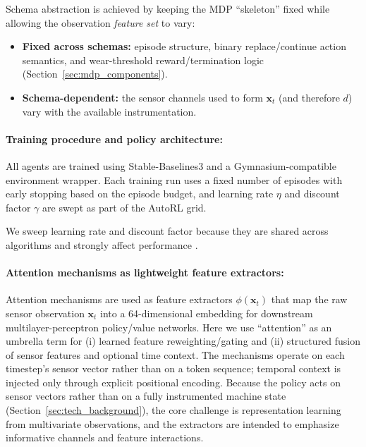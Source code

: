 \documentclass[sn-basic]{sn-jnl} %
\begin{document}
Schema abstraction is achieved by keeping the MDP ``skeleton'' fixed while allowing the observation \emph{feature set} to vary:
\begin{itemize}
	\item \textbf{Fixed across schemas:} episode structure, binary replace/continue action semantics, and wear-threshold reward/termination logic (Section~\ref{sec:mdp_components}).
	\item \textbf{Schema-dependent:} the sensor channels used to form $\mathbf{x}_t$ (and therefore $d$) vary with the available instrumentation.
\end{itemize}

\paragraph{Training procedure and policy architecture:}
All agents are trained using Stable-Baselines3 and a Gymnasium-compatible environment wrapper. Each training run uses a fixed number of episodes with early stopping based on the episode budget, and learning rate $\eta$ and discount factor $\gamma$ are swept as part of the AutoRL grid.

We sweep learning rate and discount factor because they are shared across algorithms and strongly affect performance \cite{Henderson2019, Shala2022AutoRL, Eimer2023}.
  
\paragraph{Attention mechanisms as lightweight feature extractors:}
\label{sec:attention}

Attention mechanisms are used as feature extractors $\phi(\mathbf{x}_t)$ that map the raw sensor observation $\mathbf{x}_t$ into a 64-dimensional embedding for downstream multilayer-perceptron policy/value networks. Here we use ``attention'' as an umbrella term for (i) learned feature reweighting/gating and (ii) structured fusion of sensor features and optional time context. The mechanisms operate on each timestep's sensor vector rather than on a token sequence; temporal context is injected only through explicit positional encoding. Because the policy acts on sensor vectors rather than on a fully instrumented machine state (Section~\ref{sec:tech_background}), the core challenge is representation learning from multivariate observations, and the extractors are intended to emphasize informative channels and feature interactions.
\end{document}

